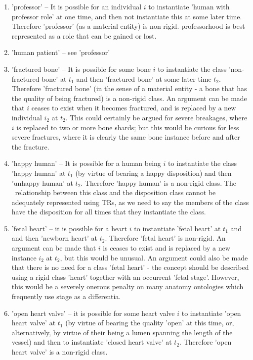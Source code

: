 \documentclass{bioinfo}
\begin{document}
\begin{enumerate}
\item 'professor' -- It is possible for an individual $i$ to
  instantiate 'human with professor role' at one time, and then not
  instantiate this at some later time. Therefore 'professor' (as a
  material entity) is non-rigid. professorhood is best represented as
  a role that can be gained or lost.

  \item 'human patient' -- see 'professor'

  \item 'fractured bone' -- It is possible for some bone $i$ to
    instantiate the class 'non-fractured bone' at $t_1$ and then
    'fractured bone' at some later time $t_2$. Therefore 'fractured
    bone' (in the sense of a material entity - a bone that has the
    quality of being fractured) is a non-rigid class. An argument can
    be made that $i$ ceases to exist when it becomes fractured, and is
    replaced by a new individual $i_2$ at $t_2$. This could certainly
    be argued for severe breakages, where $i$ is replaced to two or
    more bone shards; but this would be curious for less severe
    fractures, where it is clearly the same bone instance before and
    after the fracture.

  \item 'happy human' -- It is possible for a human being $i$ to
    instantiate the class 'happy human' at $t_1$ (by virtue of bearing
    a happy disposition) and then 'unhappy human' at $t_2$. Therefore
    'happy human' is a non-rigid class. The \
    relationship between this class and the disposition class cannot
    be adequately represented using TRs, as we need to say the members
    of the class have the disposition for all times that they
    instantiate the class.

  \item 'fetal heart' -- it is possible for a heart $i$ to instantiate
    'fetal heart' at $t_1$ and and then 'newborn heart' at
    $t_2$. Therefore 'fetal heart' is non-rigid. An argument can be
    made that $i$ is ceases to exist and is replaced by a new instance
    $i_2$ at $t_2$, but this would be unusual. An argument could also
    be made that there is no need for a class 'fetal heart' - the
    concept should be described using a rigid class 'heart' together
    with an occurrent 'fetal stage'. However, this would be a severely
    onerous penalty on many anatomy ontologies which frequently use
    stage as a differentia.

  \item 'open heart valve' -- it is possible for some heart valve $i$
    to instantiate 'open heart valve' at $t_1$ (by virtue of bearing
    the quality 'open' at this time, or, alternatively, by virtue of
    their being a lumen spanning the length of the vessel) and then to
    instantiate 'closed heart valve' at $t_2$. Therefore 'open heart
    valve' is a non-rigid class.


\end{enumerate}
\end{document}
